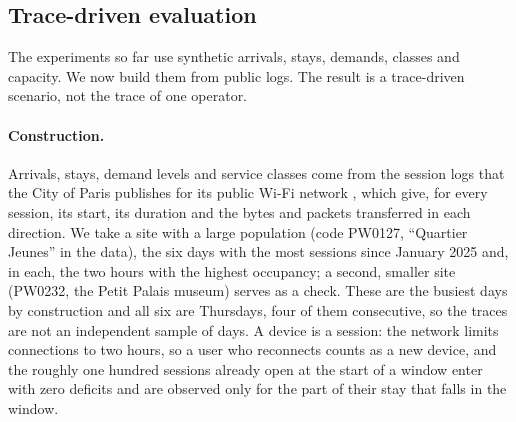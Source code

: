 \documentclass[preprint,11pt]{elsarticle}
\theoremstyle{definition}
\theoremstyle{remark}
\begin{document}
\begin{table}[t]
\centering
\caption{Unilateral misreport at a real-time share of $10\%$ ($60$ devices on two traces). The bound is $B_{g,\mathrm{v}}$ at $V=20$ for the tier of the device; capped priority uses $q=0.3$.}
\label{tab:mix-dev}
\end{table}

\subsection{Trace-driven evaluation}\label{sec:exp-real}

The experiments so far use synthetic arrivals, stays, demands, classes and capacity.
We now build them from public logs. The result is a trace-driven scenario, not the trace of one operator.

\paragraph{Construction.}
Arrivals, stays, demand levels and service classes come from the session logs that the City of Paris publishes for its public Wi-Fi network \citep{pariswifi2026}, which give, for every session, its start, its duration and the bytes and packets transferred in each direction.
We take a site with a large population (code PW0127, ``Quartier Jeunes'' in the data), the six days with the most sessions since January 2025 and, in each, the two hours with the highest occupancy; a second, smaller site (PW0232, the Petit Palais museum) serves as a check.
These are the busiest days by construction and all six are Thursdays, four of them consecutive, so the traces are not an independent sample of days.
A device is a session: the network limits connections to two hours, so a user who reconnects counts as a new device, and the roughly one hundred sessions already open at the start of a window enter with zero deficits and are observed only for the part of their stay that falls in the window.
\end{document}
